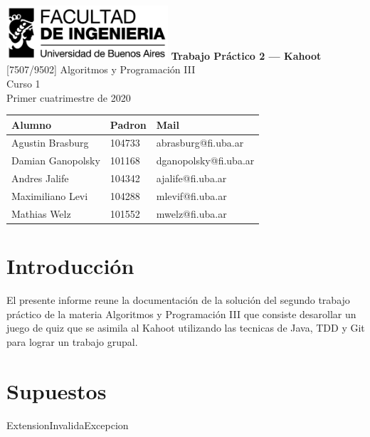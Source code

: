 \documentclass[titlepage,a4paper]{article}
\begin{document}
\begin{titlepage} %
	\hfill\includegraphics[width=6cm]{logofiuba.jpg}
    \centering
    \vfill
    \Huge \textbf{Trabajo Práctico 2 — Kahoot}
    \vskip2cm
    \Large [7507/9502] Algoritmos y Programación III\\
    Curso 1 \\ %
    Primer cuatrimestre de 2020
    \vfill
    \begin{tabular}{ | l | l | l |} %
      \hline
      Alumno & Padron & Mail \\ [0.5ex] 
      \hline\hline
     Agustin Brasburg & 104733 & abrasburg@fi.uba.ar\\ 
     \hline
     Damian Ganopolsky & 101168 & dganopolsky@fi.uba.ar\\
     \hline
     Andres Jalife & 104342 & ajalife@fi.uba.ar \\
     \hline
    Maximiliano Levi & 104288 & mlevif@fi.uba.ar \\
     \hline
     Mathias Welz & 101552 & mwelz@fi.uba.ar \\ [1ex] 
     \hline
  	\end{tabular}
    \vfill
    \vfill
\end{titlepage}

\tableofcontents %
\newpage

\section{Introducción}\label{sec:intro}
El presente informe reune la documentación de la solución del segundo trabajo práctico de la materia Algoritmos y Programación III que consiste desarollar un juego de quiz que se asimila al Kahoot utilizando las tecnicas de Java, TDD y Git para lograr un trabajo grupal.

\section{Supuestos}\label{sec:supuestos}
\item[ExtensionInvalidaExcepcion]
\end{document}

